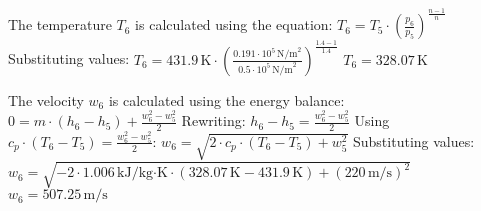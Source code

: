 The temperature \( T_6 \) is calculated using the equation:  
\( T_6 = T_5 \cdot \left( \frac{p_6}{p_5} \right)^{\frac{n-1}{n}} \)  
Substituting values:  
\( T_6 = 431.9 \, \text{K} \cdot \left( \frac{0.191 \cdot 10^5 \, \text{N/m}^2}{0.5 \cdot 10^5 \, \text{N/m}^2} \right)^{\frac{1.4-1}{1.4}} \)  
\( T_6 = 328.07 \, \text{K} \)  

The velocity \( w_6 \) is calculated using the energy balance:  
\( 0 = m \cdot (h_6 - h_5) + \frac{w_6^2 - w_5^2}{2} \)  
Rewriting:  
\( h_6 - h_5 = \frac{w_6^2 - w_5^2}{2} \)  
Using \( c_p \cdot (T_6 - T_5) = \frac{w_6^2 - w_5^2}{2} \):  
\( w_6 = \sqrt{2 \cdot c_p \cdot (T_6 - T_5) + w_5^2} \)  
Substituting values:  
\( w_6 = \sqrt{-2 \cdot 1.006 \, \text{kJ/kg·K} \cdot (328.07 \, \text{K} - 431.9 \, \text{K}) + (220 \, \text{m/s})^2} \)  
\( w_6 = 507.25 \, \text{m/s} \)